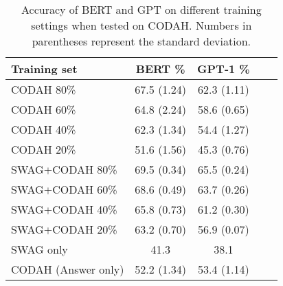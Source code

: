 \documentclass[11pt,a4paper]{article}
\begin{document}
    \begin{table}[ht]
        \begin{center}
        \small
            \begin{tabular}{|l|c|c|c|c|}
    			\hline \bf Training set    & \bf BERT \%                     & \bf GPT-1 \%  \\\hline\hline
			    CODAH 80\%               & 67.5 \hspace{0.1em} (1.24)    & 62.3 \hspace{0.1em} (1.11) \\\hline
			    CODAH 60\%               & 64.8 \hspace{0.1em} (2.24)    & 58.6 \hspace{0.1em} (0.65) \\\hline
			    CODAH 40\%               & 62.3 \hspace{0.1em} (1.34)    & 54.4 \hspace{0.1em} (1.27) \\\hline
			    CODAH 20\%               & 51.6 \hspace{0.1em} (1.56)    & 45.3 \hspace{0.1em} (0.76) \\\hline
			    SWAG+CODAH 80\%          & 69.5 \hspace{0.1em} (0.34)    & 65.5 \hspace{0.1em} (0.24) \\\hline
			    SWAG+CODAH 60\%          & 68.6 \hspace{0.1em} (0.49)    & 63.7 \hspace{0.1em} (0.26) \\\hline
			    SWAG+CODAH 40\%          & 65.8 \hspace{0.1em} (0.73)    & 61.2 \hspace{0.1em} (0.30) \\\hline
			    SWAG+CODAH 20\%          & 63.2 \hspace{0.1em} (0.70)    & 56.9 \hspace{0.1em} (0.07) \\\hline
			    SWAG only                & 41.3                          & 38.1  \\\hline
			    CODAH (Answer only)      & 52.2 \hspace{0.1em} (1.34)    & 53.4 \hspace{0.1em} (1.14)  \\\hline
            \end{tabular}
        \end{center}
        \caption{\label{table:ablation_results} Accuracy of BERT and GPT on different training settings when tested on CODAH. Numbers in parentheses represent the standard deviation.}
    \end{table}
    
\end{document}
